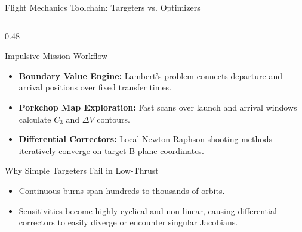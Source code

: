 \documentclass[aspectratio=169, 10pt]{beamer}
\begin{document}
\begin{frame}{Flight Mechanics Toolchain: Targeters vs. Optimizers}
    \begin{columns}[T]
        \begin{column}{0.48\textwidth}
            \begin{block}{Impulsive Mission Workflow}
                \scriptsize
                \begin{itemize}\setlength{\itemsep}{1.5pt}\setlength{\topsep}{0pt}
                    \item \textbf{Boundary Value Engine:} Lambert's problem connects departure and arrival positions over fixed transfer times.
                    \item \textbf{Porkchop Map Exploration:} Fast scans over launch and arrival windows calculate $C_3$ and $\Delta V$ contours.
                    \item \textbf{Differential Correctors:} Local Newton-Raphson shooting methods iteratively converge on target B-plane coordinates.
                \end{itemize}
            \end{block}
            \vspace{-0.15cm}
            \begin{alertblock}{Why Simple Targeters Fail in Low-Thrust}
                \scriptsize
                \begin{itemize}\setlength{\itemsep}{1.2pt}\setlength{\topsep}{0pt}
                    \item Continuous burns span hundreds to thousands of orbits.
                    \item Sensitivities become highly cyclical and non-linear, causing differential correctors to easily diverge or encounter singular Jacobians.
                \end{itemize}
            \end{alertblock}
        \end{column}


\end{columns}
\end{frame}
\end{document}
